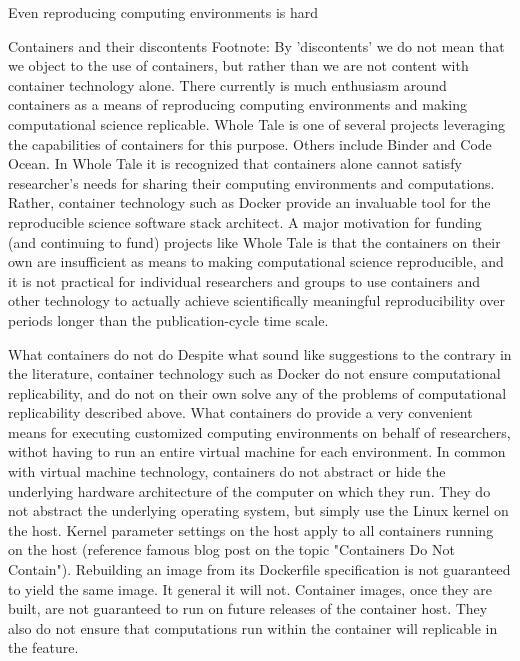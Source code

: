 		Even reproducing computing environments is hard

			Containers and their discontents
				Footnote:  By 'discontents' we do not mean that we object to the use of containers, but rather than we are not content with container technology alone.
				There currently is much enthusiasm around containers as a means of reproducing computing environments and making computational science replicable.
				Whole Tale is one of several projects leveraging the capabilities of containers for this purpose.  Others include Binder and Code Ocean.
				In Whole Tale it is recognized that containers alone cannot satisfy researcher's needs for sharing their computing environments and computations.
				Rather, container technology such as Docker provide an invaluable tool for the reproducible science software stack architect.
				A major motivation for funding (and continuing to fund) projects like Whole Tale is that the containers on their own are insufficient as means
					to making computational science reproducible, and it is not practical for individual researchers and groups to use containers
					and other technology to actually achieve scientifically meaningful reproducibility over periods longer than the publication-cycle time scale.

			What containers do not do
				Despite what sound like suggestions to the contrary in the literature, container technology such as Docker do not ensure computational replicability,
					and do not on their own solve any of the problems of computational replicability described above.
				What containers do provide a very convenient means for executing customized computing environments on behalf of researchers, withot having to run
					an entire virtual machine for each environment.
				In common with virtual machine technology, containers do not abstract or hide the underlying hardware architecture of the computer on which they run.
				They do not abstract the underlying operating system, but simply use the Linux kernel on the host.  Kernel parameter settings on the host apply to
					all containers running on the host (reference famous blog post on the topic "Containers Do Not Contain").
				Rebuilding an image from its Dockerfile specification is not guaranteed to yield the same image.  It general it will not.
				Container images, once they are built, are not guaranteed to run on future releases of the container host.
				They also do not ensure that computations run within the container will replicable in the feature.

